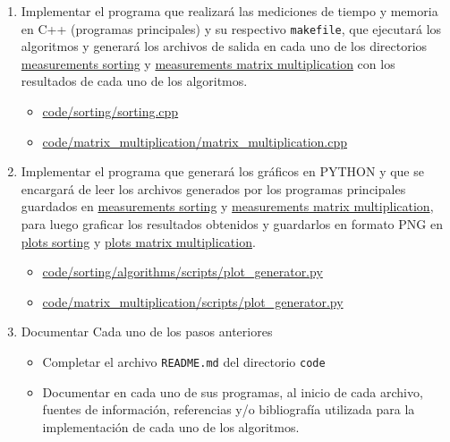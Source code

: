 \begin{enumerate}[(1)]
    \item Implementar el programa que realizará las mediciones de tiempo y memoria en C++ (programas principales) y su respectivo \texttt{makefile}, que ejecutará los algoritmos y generará los archivos de salida en cada uno de los directorios \href{https://github.com/pabloealvarez/INF221-2025-1-TAREA-1/blob/master/code/sorting/data/measurements/}{measurements sorting} y \href{https://github.com/pabloealvarez/INF221-2025-1-TAREA-1/blob/master/code/sortmatrix+multiplication/data/measurements/}{measurements matrix multiplication} con los resultados de cada uno de los algoritmos.
    \begin{itemize}
        \item \href{https://github.com/pabloealvarez/INF221-2025-1-TAREA-1/blob/master/code/sorting/sorting.cpp}{code/sorting/sorting.cpp}
        \item \href{https://github.com/pabloealvarez/INF221-2025-1-TAREA-1/blob/master/code/matrix_multiplication/matrix_multiplication.cpp}{code/matrix\_multiplication/matrix\_multiplication.cpp}
    \end{itemize}
    
    \item Implementar el programa que generará los gráficos en PYTHON y que se encargará de leer los archivos generados por los programas principales guardados en  \href{https://github.com/pabloealvarez/INF221-2025-1-TAREA-1/blob/master/code/sorting/data/measurements/}{measurements sorting} y \href{https://github.com/pabloealvarez/INF221-2025-1-TAREA-1/blob/master/code/sortmatrix+multiplication/data/measurements/}{measurements matrix multiplication}, para luego graficar los resultados obtenidos y guardarlos en formato PNG en  \href{https://github.com/pabloealvarez/INF221-2025-1-TAREA-1/blob/master/code/sorting/data/plots/}{plots sorting} y \href{https://github.com/pabloealvarez/INF221-2025-1-TAREA-1/blob/master/code/sortmatrix+multiplication/data/plots/}{plots matrix multiplication}.
    \begin{itemize}
        \item \href{https://github.com/pabloealvarez/INF221-2025-1-TAREA-1/blob/master/code/sorting/scripts/array_generator.py}{code/sorting/algorithms/scripts/plot\_generator.py}
        \item \href{https://github.com/pabloealvarez/INF221-2025-1-TAREA-1/blob/master/code/matrix_multiplication/scripts/matrix_generator.py}{code/matrix\_multiplication/scripts/plot\_generator.py}
    \end{itemize}
    \item Documentar Cada uno de los pasos anteriores
    \begin{itemize}
        \item Completar el archivo \texttt{README.md} del directorio \texttt{code}
        \item Documentar en cada uno de sus programas, al inicio de cada archivo, fuentes de información, referencias y/o bibliografía utilizada para la implementación de cada uno de los algoritmos.
    \end{itemize}
\end{enumerate}

